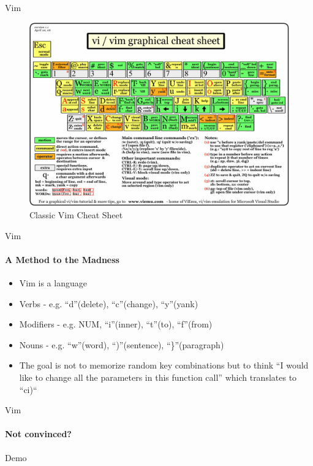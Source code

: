 \documentclass{beamer}
\begin{document}
\begin{frame}{Vim}
  \begin{figure}
    \includegraphics[scale=0.3]{../../resources/vim/vim_cheat_sheet_classic}
    \caption{Classic Vim Cheat Sheet\cite{VimCheatSheet}}
  \end{figure}
\end{frame}



\begin{frame}{Vim}
  \framesubtitle{A Method to the Madness}

  \begin{itemize}\setlength\itemsep{1em}
    \item Vim is a language
    \item Verbs - e.g. {``d''(delete), ``c''(change), ``y''(yank)}
    \item Modifiers - e.g. {NUM, ``i''(inner), ``t''(to), ``f''(from)}
    \item Nouns - e.g. {``w''(word), ``)''(sentence), ``\}''(paragraph)}
    \item The goal is not to memorize random key combinations but to think
      ``I would like to change all the parameters in this function call'' which
      translates to ``ci)``
  \end{itemize}

\end{frame}

\begin{frame}{Vim}
  \framesubtitle{Not convinced?}
  \begin{center}
    {\Huge Demo }
  \end{center}

\end{frame}
\end{document}

